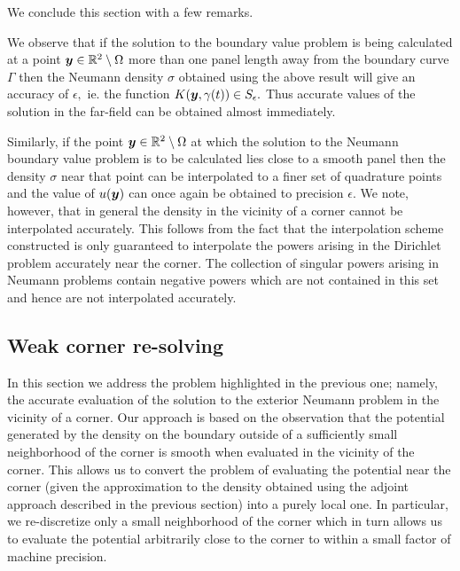 We conclude this section with a few remarks. 

\begin{remark1}
We observe that if the solution to the boundary value problem is being calculated at a point $\boldsymbol{y} \in \mathbb{R}^2\setminus \Omega$ more than one panel length away from the boundary curve $\Gamma$ then the Neumann density $\sigma$ obtained using the above result will give an accuracy of $\epsilon,$ ie. the function $K(\boldsymbol{y},\gamma(t)) \in S_\epsilon.$ Thus accurate values of the solution in the far-field can be obtained almost immediately.
\end{remark1}
\begin{remark1}
Similarly, if the point $\boldsymbol{y} \in \mathbb{R}^2 \setminus \Omega$ at which the solution to the Neumann boundary value problem is to be calculated lies close to a smooth panel then the density $\sigma$ near that point can be interpolated to a finer set of quadrature points and the value of $u(\boldsymbol{y})$ can once again be obtained to precision $\epsilon.$ We note, however, that in general the density in the vicinity of a corner cannot be interpolated accurately. This follows from the fact that the interpolation scheme constructed is only guaranteed to interpolate the powers arising in the Dirichlet problem accurately near the corner. The collection of singular powers arising in Neumann problems contain negative powers which are not contained in this set and hence are not interpolated accurately.
\end{remark1}

\subsection{Weak corner re-solving}
In this section we address the problem highlighted in the previous one; namely, the accurate evaluation of the solution to the exterior Neumann problem in the vicinity of a corner. Our approach is based on the observation that the potential generated by the density on the boundary outside of a sufficiently small neighborhood of the corner is smooth when evaluated in the vicinity of the corner. This allows us to convert the problem of evaluating the potential near the corner (given the approximation to the density obtained using the adjoint approach described in the previous section) into a purely local one. In particular, we re-discretize only a small neighborhood of the corner which in turn allows us to evaluate the potential arbitrarily close to the corner to within a small factor of machine precision. 

